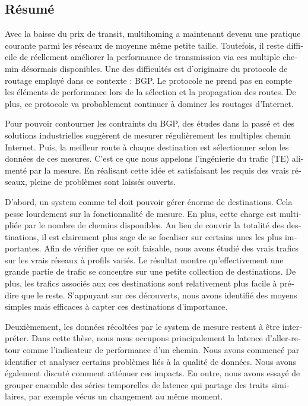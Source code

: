 \iffalse
\begin{otherlanguage}{french}
\chapter*{Résumé}
Avec la baisse du prix de transit, multihoming a maintenant devenu une pratique courante parmi les réseaux de moyenne même petite taille.
Toutefois, il reste difficile de réellement améliorer la performance de transmission via ces multiple chemin désormais disponibles.
Une des difficultés est d’originaire du protocole de routage employé dans ce contexte : \acf{BGP}.
Le protocole ne prend pas en compte les éléments de performance lors de la sélection et la propagation des routes.
De plus, ce protocole va probablement continuer à dominer les routages d’Internet.

Pour pouvoir contourner les contraints du \ac{BGP}, des études dans la passé et des solutions industrielles suggèrent de mesurer régulièrement les multiples chemin Internet.
Puis, la meilleur route à chaque destination est sélectionner selon les données de ces mesures. C’est ce que nous appelons l’ingénierie du trafic (TE) alimenté par la mesure.
En réalisant cette idée et satisfaisant les requis des vrais réseaux, pleine de problèmes sont laissés ouverts.

D’abord, un system comme tel doit pouvoir gérer énorme de destinations.
Cela pesse lourdement sur la fonctionnalité de mesure.
En plus, cette charge est multipliée par le nombre de chemins disponibles.
Au lieu de couvrir la totalité des destinations, il est clairement plus sage de se focaliser sur certains unes les plus importantes.
Afin de vérifier que ce soit faisable, nous avons étudié des vrais trafics sur les vrais réseaux à profils variés.
Le résultat montre qu’effectivement une grande partie de trafic se concentre sur une petite collection de destinations.
De plus, les trafics associés aux ces destinations sont relativement plus facile à prédire que le reste.
S’appuyant sur ces découverts, nous avons identifié des moyens simples mais efficaces à capter ces destinations d’importance.

Deuxièmement, les données récoltées par le system de mesure restent à être interpréter.
Dans cette thèse, nous nous occupons principalement la latence d’aller-retour comme l’indicateur de performance d’un chemin.
Nous avons commencé par identifier et analyser certains problèmes liés à la qualité de données.
Nous avons également discuté comment atténuer ces impacts.
En outre, nous avons essayé de grouper ensemble des séries temporelles de latence qui partage des traits similaires, par exemple vécus un changement au même moment.


\end{otherlanguage}

